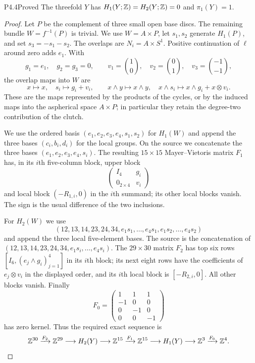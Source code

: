\begin{statement}{P4.4}{Proved}
The threefold $Y$ has $H_1(Y;\mathbb Z)=H_2(Y;\mathbb Z)=0$ and $\pi_1(Y)=1$.
\end{statement}
\begin{proof}
Let $P$ be the complement of three small open base discs. The remaining
bundle $W=f^{-1}(P)$ is trivial. We use $W=A\times P$, let $s_1,s_2$
generate $H_1(P)$, and set $s_3=-s_1-s_2$. The overlaps are
$N_i=A\times S^1$. Positive continuation of $\ell$ around zero adds $e_1$.
With
\[
 g_1=e_1,\quad g_2=g_3=0,\qquad
 v_1=\binom10,\quad v_2=\binom01,\quad v_3=\binom{-1}{-1},
\]
the overlap maps into $W$ are
\[
 x\mapsto x,\quad s_i\mapsto g_i+v_i,\qquad
 x\wedge y\mapsto x\wedge y,\quad
 x\wedge s_i\mapsto x\wedge g_i+x\otimes v_i.
\]
These are the maps represented by the products of the cycles, or by the
induced maps into the aspherical space $A\times P$; in particular they
retain the degree-two contribution of the clutch.

We use the ordered basis $(e_1,e_2,e_3,e_4,s_1,s_2)$ for $H_1(W)$ and
append the three bases $(c_i,b_i,d_i)$ for the local groups. On the source
we concatenate the three bases $(e_1,e_2,e_3,e_4,s_i)$. The resulting
$15\times15$ Mayer--Vietoris matrix $F_1$ has, in its $i$th five-column
block, upper block
\[
 \begin{pmatrix}I_4&g_i\\0_{2\times4}&v_i\end{pmatrix}
\]
and local block $(-R_{1,i},0)$ in the $i$th summand; its other local
blocks vanish. The sign is the usual difference of the two inclusions.

For $H_2(W)$ we use
\[
 (12,13,14,23,24,34,e_1s_1,\ldots,e_4s_1,e_1s_2,\ldots,e_4s_2)
\]
and append the three local five-element bases. The source is the
concatenation of $(12,13,14,23,24,34,e_1s_i,\ldots,e_4s_i)$.
The $29\times30$ matrix $F_2$ has top six rows
$[I_6,(e_j\wedge g_i)_{j=1}^4]$ in its $i$th block; its next eight rows
have the coefficients of $e_j\otimes v_i$ in the displayed order, and
its $i$th local block is $[-R_{2,i},0]$. All other blocks vanish.
Finally
\[
 F_0=\begin{pmatrix}1&1&1\\-1&0&0\\0&-1&0\\0&0&-1\end{pmatrix}
\]
has zero kernel. Thus the required exact sequence is
\[
 \mathbb Z^{30}\xrightarrow{F_2}\mathbb Z^{29}\longrightarrow H_2(Y)
 \longrightarrow\mathbb Z^{15}\xrightarrow{F_1}\mathbb Z^{15}\longrightarrow H_1(Y)
 \longrightarrow\mathbb Z^3\xrightarrow{F_0}\mathbb Z^4.
\]


\end{proof}
